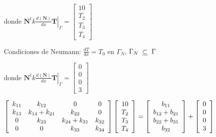 \documentclass[12pt]{report}
\begin{document}
        donde $\displaystyle \left. \textbf{N}^t  k \frac{d(\textbf{N})}{dx} \textbf{T} \right|_{\Gamma} = \left[ \begin{array}{c} 10 \\ T_2 \\ T_3 \\ T_4 \end{array} \right]$


        Condiciones de Neumann: $\frac{dT}{dx} = T_0$ en $\Gamma_N$, $\Gamma_N \hspace{0.2cm} \underline{\subset} \hspace{0.2cm} \Gamma$ 

        donde $\displaystyle \left. \textbf{N}^t  k \frac{d(\textbf{N})}{dx} \textbf{T} \right|_{\Gamma} = \left[ \begin{array}{c} 0 \\ 0 \\ 0 \\ 3 \end{array} \right]$

        \begin{center}
            $\displaystyle \left[ \begin{array}{c c c c}  
                k_{1 1} & k_{1 2} & 0 & 0 \\
                k_{1 3} & k_{1 4} + k_{2 1} & k_{2 2} & 0 \\
                0 & k_{2 3} & k_{2 4} + k_{3 1} & k_{3 2} \\
                0 & 0 & k_{3 3} & k_{3 4}
            \end{array}\right] \left[ \begin{array}{c}
                10 \\
                T_2 \\
                T_3 \\
                T_4 \\
            \end{array} \right] = \left[\begin{array}{c}
                b_{1 1} \\
                b_{1 2} + b_{2 1} \\
                b_{2 2} + b_{3 1} \\
                b_{3 2}
            \end{array}\right]+ \left[ \begin{array}{c} 0 \\ 0 \\ 0 \\ 3 \end{array} \right]$
        \end{center}

    
\end{document}
